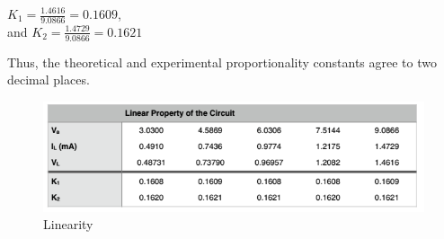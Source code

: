 \documentclass[12pt]{article}
\begin{document}
\begin{center}
	$K_{1} =\frac{1.4616}{9.0866} = 0.1609$,\\[0.3em]
	and $K_{2} = \frac{1.4729}{9.0866} = 0.1621$
\end{center}
Thus, the theoretical and experimental proportionality constants agree to two decimal places.
\begin{figure}[htbp]
	\centering
	\includegraphics[scale=1]{LinearityMeasurement.png}
	\caption{Linearity}
	\label{fig.linMeasure}
\end{figure}
\pagebreak
\end{document}

